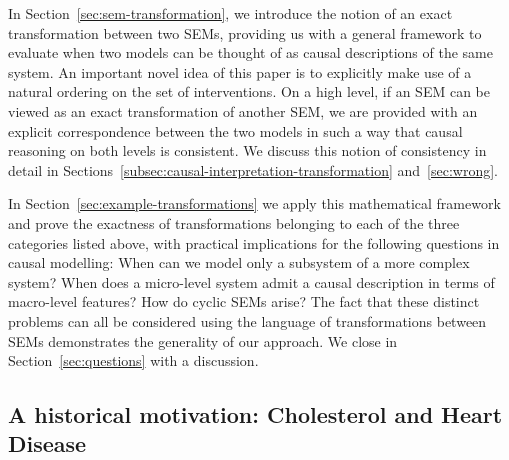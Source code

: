 In Section~\ref{sec:sem-transformation}, we introduce the notion of an exact transformation between two SEMs, providing us with a general framework to evaluate when two models can be thought of as causal descriptions of the same system.
An important novel idea of this paper is to explicitly make use of a natural ordering on the set of interventions.
On a high level, if an SEM can be viewed as an exact transformation of another SEM, we are provided with an explicit correspondence between the two models in such a way that causal reasoning on both levels is consistent.
We discuss this notion of consistency in detail in Sections~\ref{subsec:causal-interpretation-transformation} and~\ref{sec:wrong}.

In Section~\ref{sec:example-transformations} we apply this mathematical framework and prove the exactness of transformations belonging to each of the three categories listed above, with practical implications for the following questions in causal modelling:
When can we model only a subsystem of a more complex system?
When does a micro-level system admit a causal description in terms of macro-level features?
How do cyclic SEMs arise?
The fact that these distinct problems can all be considered using the language of transformations between SEMs demonstrates the generality of our approach.
We close in Section~\ref{sec:questions} with a discussion.




\subsection{A historical motivation: Cholesterol and Heart Disease}\label{sec:cholesterol}

